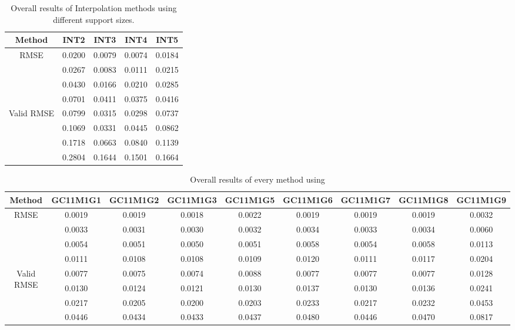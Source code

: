 \begin{table}[ht!]
\centering
\begin{tabular}{c|c|c|c|c}
Method & \scriptsize{INT2} & \scriptsize{INT3} & \scriptsize{INT4} & \scriptsize{INT5}\\ \hline 
\multirow{4}{*}{RMSE} & 0.0200 & 0.0079 & 0.0074 & 0.0184 \\ 
 & 0.0267 & 0.0083 & 0.0111 & 0.0215 \\ 
 & 0.0430 & 0.0166 & 0.0210 & 0.0285 \\ 
 & 0.0701 & 0.0411 & 0.0375 & 0.0416 \\ 
 \hline
\multirow{4}{*}{Valid RMSE} & 0.0799 & 0.0315 & 0.0298 & 0.0737 \\ 
 & 0.1069 & 0.0331 & 0.0445 & 0.0862 \\ 
 & 0.1718 & 0.0663 & 0.0840 & 0.1139 \\ 
 & 0.2804 & 0.1644 & 0.1501 & 0.1664 \\ 
 \hline 
\end{tabular}
\caption{Overall results of Interpolation methods using different support sizes.}
\label{tab:INT}
\end{table}


\begin{table}[ht!]
\centering
\begin{tabular}{c|c|c|c|c|c|c|c|c}
Method & \scriptsize{GC11M1G1} & \scriptsize{GC11M1G2} & \scriptsize{GC11M1G3} & \scriptsize{GC11M1G5} & \scriptsize{GC11M1G6} & \scriptsize{GC11M1G7} & \scriptsize{GC11M1G8} & \scriptsize{GC11M1G9}\\ \hline 
\multirow{4}{*}{RMSE} & 0.0019 & 0.0019 & 0.0018 & 0.0022 & 0.0019 & 0.0019 & 0.0019 & 0.0032 \\ 
 & 0.0033 & 0.0031 & 0.0030 & 0.0032 & 0.0034 & 0.0033 & 0.0034 & 0.0060 \\ 
 & 0.0054 & 0.0051 & 0.0050 & 0.0051 & 0.0058 & 0.0054 & 0.0058 & 0.0113 \\ 
 & 0.0111 & 0.0108 & 0.0108 & 0.0109 & 0.0120 & 0.0111 & 0.0117 & 0.0204 \\ 
 \hline
\multirow{4}{*}{Valid RMSE} & 0.0077 & 0.0075 & 0.0074 & 0.0088 & 0.0077 & 0.0077 & 0.0077 & 0.0128 \\ 
 & 0.0130 & 0.0124 & 0.0121 & 0.0130 & 0.0137 & 0.0130 & 0.0136 & 0.0241 \\ 
 & 0.0217 & 0.0205 & 0.0200 & 0.0203 & 0.0233 & 0.0217 & 0.0232 & 0.0453 \\ 
 & 0.0446 & 0.0434 & 0.0433 & 0.0437 & 0.0480 & 0.0446 & 0.0470 & 0.0817 \\ 
 \hline 
\end{tabular}
\caption{Overall results of every method using }
\label{tab:GC11M1}
\end{table}


